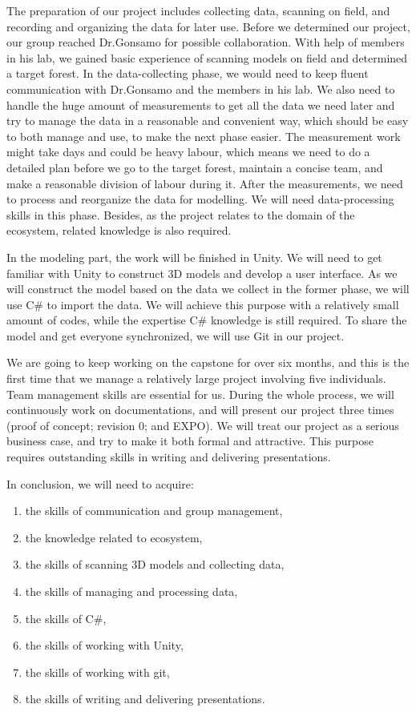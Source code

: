\documentclass{article}
\begin{document}
The preparation of our project includes collecting data, scanning on field, and recording and organizing the data for later use. Before we determined our project, our group reached Dr.Gonsamo for possible collaboration. With help of members in his lab, we gained basic experience of scanning models on field and determined a target forest. In the data-collecting phase, we would need to keep fluent communication with Dr.Gonsamo and the members in his lab. We also need to handle the huge amount of measurements to get all the data we need later and try to manage the data in a reasonable and convenient way, which should be easy to both manage and use, to make the next phase easier. The measurement work might take days and could be heavy labour, which means we need to do a detailed plan before we go to the target forest, maintain a concise team, and make a reasonable division of labour during it. After the measurements, we need to process and reorganize the data for modelling. We will need data-processing skills in this phase. Besides, as the project relates to the domain of the ecosystem, related knowledge is also required. 

In the modeling part, the work will be finished in Unity. We will need to get familiar with Unity to construct 3D models and develop a user interface. As we will construct the model based on the data we collect in the former phase, we will use C\# to import the data. We will achieve this purpose with a relatively small amount of codes, while the expertise C\# knowledge is still required. To share the model and get everyone synchronized, we will use Git in our project. 

We are going to keep working on the capstone for over six months, and this is the first time that we manage a relatively large project involving five individuals. Team management skills are essential for us. During the whole process, we will continuously work on documentations, and will present our project three times (proof of concept; revision 0; and EXPO). We will treat our project as a serious business case, and try to make it both formal and attractive. This purpose requires outstanding skills in writing and delivering presentations. 

In conclusion, we will need to acquire: 
\begin{enumerate}
    \item the skills of communication and group management,
    \item the knowledge related to ecosystem,
    \item the skills of scanning 3D models and collecting data,
    \item the skills of managing and processing data,
    \item the skills of C\#,
    \item the skills of working with Unity,
    \item the skills of working with git,
    \item the skills of writing and delivering presentations.
\end{enumerate}
\end{document}
